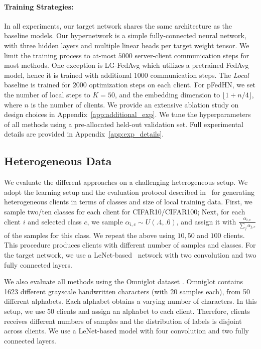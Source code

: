 \documentclass{article}
\newcommand\ourmethod{pFedHN}
\begin{document}
\paragraph{Training Strategies:} In all experiments, our target network shares the same architecture as the baseline models. Our hypernetwork is a simple fully-connected neural network, with three hidden layers and multiple linear heads per target weight tensor. We limit the training process to at-most $5000$ server-client communication steps for most methods. One exception is LG-FedAvg which utilizes a pretrained FedAvg model, hence it is trained with additional $1000$ communication steps. The \textit{Local} baseline is trained for $2000$ optimization steps on each client. For \ourmethod{}, we set the number of local steps to $K=50$, and the embedding dimension to $\lfloor 1+n / 4 \rfloor$, where $n$ is the number of clients. We provide an extensive ablation study on design choices in Appendix~\ref{app:additional_exp}.
We tune the hyperparameters of all methods using a pre-allocated held-out validation set. Full experimental details are provided in Appendix~\ref{app:exp_details}.

\subsection{Heterogeneous Data}\label{sec:hetro}



We evaluate the different approaches on a challenging heterogeneous setup. We adopt the learning setup and the evaluation protocol described  in~\citet{Dinh2020PersonalizedFL} for generating heterogeneous clients in terms of classes and size of local training data.  First, we sample two/ten classes for each client for CIFAR10/CIFAR100; Next, for each client $i$ and selected class $c$, we sample $\alpha_{i,c}\sim U(.4,.6)$, and assign it with $\frac{\alpha_{i,c}}{\sum_j \alpha_{j,c}}$ of the samples for this class. We repeat the above using $10, 50$ and $100$ clients. This procedure produces clients with different number of samples and classes.
For the target network, we use a LeNet-based~\cite{lecun1998gradient} network with two convolution and two fully connected layers.


We also evaluate all methods using the Omniglot dataset \cite{lake2015human}.
Omniglot contains 1623 different grayscale handwritten characters (with 20 samples each), from 50 different alphabets. Each alphabet obtains a varying number of characters. In this setup, we use 50 clients and assign an alphabet to each client. Therefore, clients receives  different numbers of samples and the distribution of labels is disjoint across clients. We use a LeNet-based model with four convolution and two fully connected layers.
\end{document}
